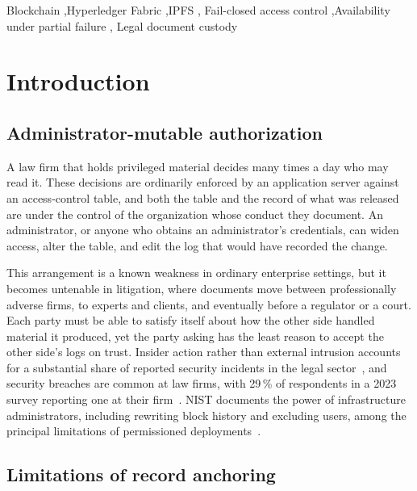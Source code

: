 \documentclass[preprint,12pt]{elsarticle}
\begin{document}
\begin{frontmatter}
\begin{keyword}
Blockchain \sep Hyperledger Fabric \sep IPFS \sep
Fail-closed access control \sep Availability under partial failure \sep
Legal document custody
\end{keyword}

\end{frontmatter}

\section{Introduction}
\label{sec:introduction}


\subsection{Administrator-mutable authorization}
\label{sec:problem}

A law firm that holds privileged material decides many times a day who may
read it. These decisions are ordinarily enforced by an application server
against an access-control table, and both the table and the record of what was
released are under the control of the organization whose conduct they document.
An administrator, or anyone who obtains an administrator's credentials, can
widen access, alter the table, and edit the log that would have recorded the
change.

This arrangement is a known weakness in ordinary enterprise settings, but it
becomes untenable in litigation, where documents move between professionally
adverse firms, to experts and clients, and eventually before a regulator or a
court. Each party must be able to satisfy itself about how the other side
handled material it produced, yet the party asking has the least reason to
accept the other side's logs on trust. Insider action
rather than external intrusion accounts for a substantial share of reported
security incidents in the legal sector~\cite{ico2024trends}, and security
breaches are common at law firms, with 29\,\% of respondents in a 2023 survey
reporting one at their firm~\cite{aba2023}. NIST documents the power of infrastructure administrators, including
rewriting block history and excluding users, among the principal limitations
of permissioned deployments~\cite{nistir8202}.

\subsection{Limitations of record anchoring}
\label{sec:anchoring_insufficient}
\end{document}
